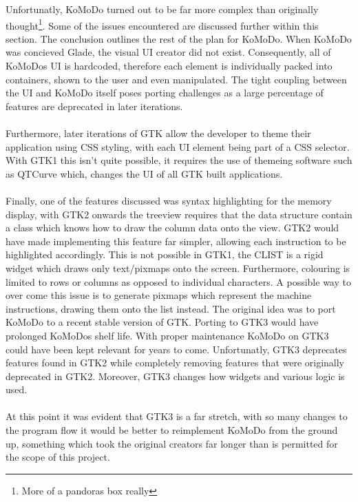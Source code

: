   Unfortunatly, KoMoDo turned out to be far more complex than originally thought\footnote{More of a pandoras box really}. Some of the issues encountered are discussed further within this section. The conclusion outlines the rest of the plan for KoMoDo.
    When KoMoDo was concieved Glade, the visual UI creator did not exist. Consequently, all of KoMoDos UI is hardcoded, therefore each element is individually packed into containers, shown to the user and even manipulated. The tight coupling between the UI and KoMoDo itself poses porting challenges as a large percentage of features are deprecated in later iterations.\\\\
    Furthermore, later iterations of GTK allow the developer to theme their application using CSS styling, with each UI element being part of a CSS selector. With GTK1 this isn't quite possible, it requires the use of themeing software such as QTCurve which, changes the UI of all GTK built applications.\\\\
    Finally, one of the features discussed was syntax highlighting for the memory display, with GTK2 onwards the treeview requires that the data structure contain a class which knows how to draw the column data onto the view. GTK2 would have made implementing this feature far simpler, allowing each instruction to be highlighted accordingly. This is not possible in GTK1, the CLIST is a rigid widget which draws only text/pixmaps onto the screen. Furthermore, colouring is limited to rows or columns as opposed to individual characters. A possible way to over come this issue is to generate pixmaps which represent the machine instructions, drawing them onto the list instead.
    The original idea was to port KoMoDo to a recent stable version of GTK. Porting to GTK3 would have prolonged KoMoDos shelf life. With proper maintenance KoMoDo on GTK3 could have been kept relevant for years to come. Unfortunatly, GTK3 deprecates features found in GTK2 while completely removing features that were originally deprecated in GTK2. Moreover, GTK3 changes how widgets and various logic is used.\\\\
    At this point it was evident that GTK3 is a far stretch, with so many changes to the program flow it would be better to reimplement KoMoDo from the ground up, something which took the original creators far longer than is permitted for the scope of this project.

